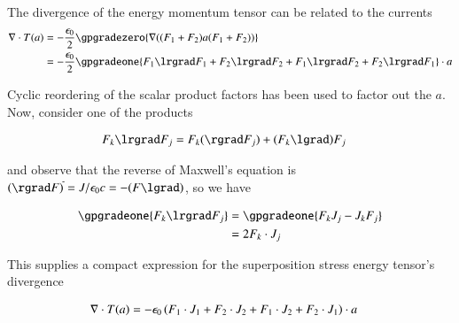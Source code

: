 The divergence of the energy momentum tensor can be related to the currents 
\begin{align*}
\grad \cdot T(a) 
&= -\frac{\e}{2} \gpgradezero{\grad ((F_1 + F_2)a(F_1 + F_2))} \\
&= -\frac{\e}{2} \gpgradeone{ F_1 \lrgrad F_1 + F_2 \lrgrad F_2  + F_1 \lrgrad F_2  + F_2 \lrgrad F_1 } \cdot a \\
\end{align*}

Cyclic reordering of the scalar product factors has been used to factor out the $a$.  Now, consider one of the products

\begin{align*}
F_k \lrgrad F_j &= F_k (\rgrad F_j) + (F_k \lgrad) F_j
\end{align*}

and observe that the reverse of Maxwell's equation is $(\rgrad F)^{\tilde{}} = J/\e c = - (F \lgrad)$, so we have

\begin{align*}
\gpgradeone{ F_k \lrgrad F_j } 
&= \gpgradeone{ F_k J_j - J_k F_j} \\
&= 2 F_k \cdot J_j 
\end{align*}

This supplies a compact expression for the superposition stress energy tensor's divergence

\begin{align}
\nabla \cdot T(a) 
&= -{\epsilon_0} \left( F_1 \cdot J_1 + F_2 \cdot J_2  + F_1 \cdot J_2  + F_2 \cdot J_1 \right) \cdot a 
\end{align}

\EndArticle
